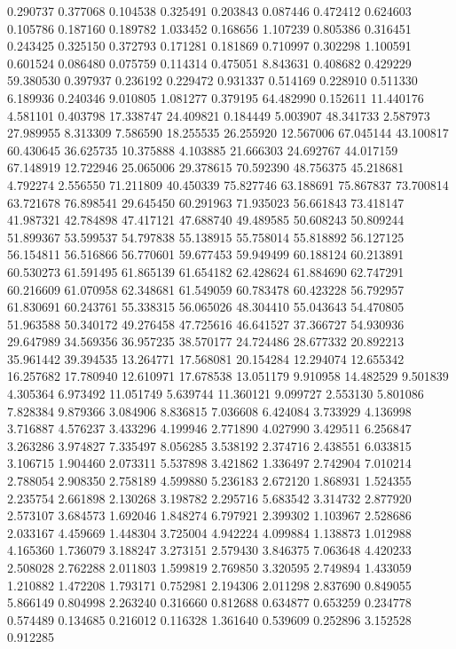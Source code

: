 0.290737
0.377068
0.104538
0.325491
0.203843
0.087446
0.472412
0.624603
0.105786
0.187160
0.189782
1.033452
0.168656
1.107239
0.805386
0.316451
0.243425
0.325150
0.372793
0.171281
0.181869
0.710997
0.302298
1.100591
0.601524
0.086480
0.075759
0.114314
0.475051
8.843631
0.408682
0.429229
59.380530
0.397937
0.236192
0.229472
0.931337
0.514169
0.228910
0.511330
6.189936
0.240346
9.010805
1.081277
0.379195
64.482990
0.152611
11.440176
4.581101
0.403798
17.338747
24.409821
0.184449
5.003907
48.341733
2.587973
27.989955
8.313309
7.586590
18.255535
26.255920
12.567006
67.045144
43.100817
60.430645
36.625735
10.375888
4.103885
21.666303
24.692767
44.017159
67.148919
12.722946
25.065006
29.378615
70.592390
48.756375
45.218681
4.792274
2.556550
71.211809
40.450339
75.827746
63.188691
75.867837
73.700814
63.721678
76.898541
29.645450
60.291963
71.935023
56.661843
73.418147
41.987321
42.784898
47.417121
47.688740
49.489585
50.608243
50.809244
51.899367
53.599537
54.797838
55.138915
55.758014
55.818892
56.127125
56.154811
56.516866
56.770601
59.677453
59.949499
60.188124
60.213891
60.530273
61.591495
61.865139
61.654182
62.428624
61.884690
62.747291
60.216609
61.070958
62.348681
61.549059
60.783478
60.423228
56.792957
61.830691
60.243761
55.338315
56.065026
48.304410
55.043643
54.470805
51.963588
50.340172
49.276458
47.725616
46.641527
37.366727
54.930936
29.647989
34.569356
36.957235
38.570177
24.724486
28.677332
20.892213
35.961442
39.394535
13.264771
17.568081
20.154284
12.294074
12.655342
16.257682
17.780940
12.610971
17.678538
13.051179
9.910958
14.482529
9.501839
4.305364
6.973492
11.051749
5.639744
11.360121
9.099727
2.553130
5.801086
7.828384
9.879366
3.084906
8.836815
7.036608
6.424084
3.733929
4.136998
3.716887
4.576237
3.433296
4.199946
2.771890
4.027990
3.429511
6.256847
3.263286
3.974827
7.335497
8.056285
3.538192
2.374716
2.438551
6.033815
3.106715
1.904460
2.073311
5.537898
3.421862
1.336497
2.742904
7.010214
2.788054
2.908350
2.758189
4.599880
5.236183
2.672120
1.868931
1.524355
2.235754
2.661898
2.130268
3.198782
2.295716
5.683542
3.314732
2.877920
2.573107
3.684573
1.692046
1.848274
6.797921
2.399302
1.103967
2.528686
2.033167
4.459669
1.448304
3.725004
4.942224
4.099884
1.138873
1.012988
4.165360
1.736079
3.188247
3.273151
2.579430
3.846375
7.063648
4.420233
2.508028
2.762288
2.011803
1.599819
2.769850
3.320595
2.749894
1.433059
1.210882
1.472208
1.793171
0.752981
2.194306
2.011298
2.837690
0.849055
5.866149
0.804998
2.263240
0.316660
0.812688
0.634877
0.653259
0.234778
0.574489
0.134685
0.216012
0.116328
1.361640
0.539609
0.252896
3.152528
0.912285
